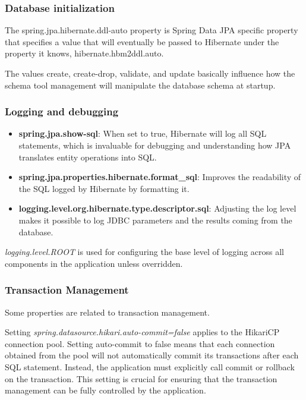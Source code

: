 \begin{verbatim}
\end{verbatim}

\subsubsection{Database initialization}
The spring.jpa.hibernate.ddl-auto property is Spring Data JPA specific property that specifies a value that will eventually be passed to Hibernate under the property it knows, hibernate.hbm2ddl.auto.

The values create, create-drop, validate, and update basically influence how the schema tool management will manipulate the database schema at startup.

\subsubsection{Logging and debugging}

\begin{itemize}
\item \textbf{spring.jpa.show-sql}: When set to true, Hibernate will log all SQL statements, which is invaluable for debugging and understanding how JPA translates entity operations into SQL.

\item \textbf{spring.jpa.properties.hibernate.format_sql}: Improves the readability of the SQL logged by Hibernate by formatting it.

\item \textbf{logging.level.org.hibernate.type.descriptor.sql}: Adjusting the log level makes it possible to log JDBC parameters and the results coming from the database.
\end{itemize}

\textit{logging.level.ROOT} is used for configuring the base level of logging across all components in the application unless overridden.

\subsubsection{Transaction Management}

Some properties are related to transaction management. 

Setting \textit{spring.datasource.hikari.auto-commit=false} applies to the HikariCP connection pool. Setting auto-commit to false means that each connection obtained from the pool will not automatically commit its transactions after each SQL statement. Instead, the application must explicitly call commit or rollback on the transaction. This setting is crucial for ensuring that the transaction management can be fully controlled by the application.

